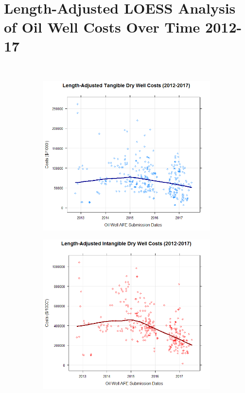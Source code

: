 \documentclass{article}
\begin{document}
\begin{enumerate}
\\\\\\\\\\\\\\\\\\\\
\break
\\\\\\\\\\\\\\\\
\section{Length-Adjusted LOESS Analysis of Oil Well Costs Over Time 2012-17}
\\
\begin{figure}[h]
\centering
\begin{subfigure}{.5\textwidth}
  \centering
  \includegraphics[width=.8\linewidth]{LengthTangibleDryWell}
  \label{fig:sub1}
\end{subfigure}%
\begin{subfigure}{.5\textwidth}
  \centering
  \includegraphics[width=.8\linewidth]{LengthIntangibleDryWell}

\end{subfigure}
\end{figure}
\end{enumerate}
\end{document}
